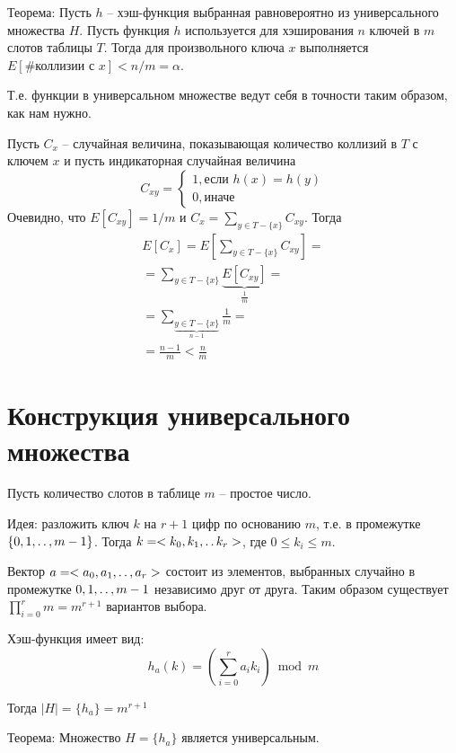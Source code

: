 \documentclass[11pt]{article}
\begin{document}
Теорема: Пусть $h$ -- хэш-функция выбранная равновероятно из универсального множества $H$. Пусть функция $h$ используется для хэширования $n$ ключей в $m$ слотов таблицы $T$. Тогда для произвольного ключа $x$ выполняется $E[\#\text{коллизии с }x] < n/m = \alpha$.

Т.е. функции в универсальном множестве ведут себя в точности таким образом, как нам нужно.

Пусть $C_x$ -- случайная величина, показывающая количество коллизий в $T$ с ключем $x$ и пусть индикаторная случайная величина
\begin{equation*}
  C_{xy} = \begin{cases}
      1, \text{если } h(x) = h(y) \\
      0, \text{иначе}
  \end{cases}
\end{equation*}
Очевидно, что $E[C_{xy}] = 1/m$ и $C_x = \sum_{y \in T-\{x\}}C_{xy}$. Тогда
\begin{align*}
  E[C_x] = E\left[\sum_{y \in T-\{x\}}C_{xy}\right] = \\
  = \sum_{y \in T-\{x\}}\underbrace{E[C_{xy}]}_{\frac{1}{m}} = \\
  = \sum_{ \underbrace{y \in T-\{x\}}_{n-1} }\frac{1}{m} = \\
  = \frac{n-1}{m} < \frac{n}{m}
\end{align*}

\section{Конструкция универсального множества}

Пусть количество слотов в таблице $m$ -- простое число.

Идея: разложить ключ $k$ на $r+1$ цифр по основанию $m$, т.е. в промежутке $\{0, 1, \mathinner{\ldotp\ldotp}, m-1\}$. Тогда $k = < k_0, k_1, \mathinner{\ldotp\ldotp} k_r >$, где $0 \leqslant k_i \leqslant m$.

Вектор $a = <a_0, a_1, \mathinner{\ldotp\ldotp}, a_r>$ состоит из элементов, выбранных случайно в промежутке ${0, 1, \mathinner{\ldotp\ldotp}, m-1}$ независимо друг от друга. Таким образом существует $\prod_{i=0}^{r} m = m^{r+1}$ вариантов выбора.

Хэш-функция имеет вид:
\begin{equation*}
  h_a(k) = \left(\sum_{i=0}^{r} a_i k_i\right) \bmod m
\end{equation*}

Тогда $|H| = \{ h_a \} = m^{r+1}$

Теорема: Множество $H = \{h_a\}$ является универсальным.
\end{document}
